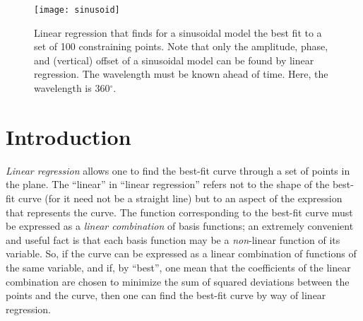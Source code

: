 \documentclass[twocolumn]{article}
\begin{document}
\thispagestyle{fancy}

%
%

\begin{figure}
   \begin{center}
      \texttt{[image: sinusoid]}
      \caption{%
         Linear regression that finds for a sinusoidal model the best fit to a
         set of 100 constraining points.  Note that only the amplitude, phase,
         and (vertical) offset of a sinusoidal model can be found by linear
         regression. The wavelength must be known ahead of time. Here, the
         wavelength is 360$^\circ$.%
      }
      \label{fig:sinusoid}
   \end{center}
\end{figure}

\section{Introduction}

\emph{Linear regression} allows one to find the best-fit curve through a set of
points in the plane. The ``linear'' in ``linear regression'' refers not to the
shape of the best-fit curve (for it need not be a straight line) but to an
aspect of the expression that represents the curve. The function corresponding
to the best-fit curve must be expressed as a \emph{linear combination} of basis
functions; an extremely convenient and useful fact is that each basis function
may be a \emph{non}-linear function of its variable.  So, if the curve can be
expressed as a linear combination of functions of the same variable, and if, by
``best'', one mean that the coefficients of the linear combination are chosen
to minimize the sum of squared deviations between the points and the curve,
then one can find the best-fit curve by way of linear regression.
\end{document}
